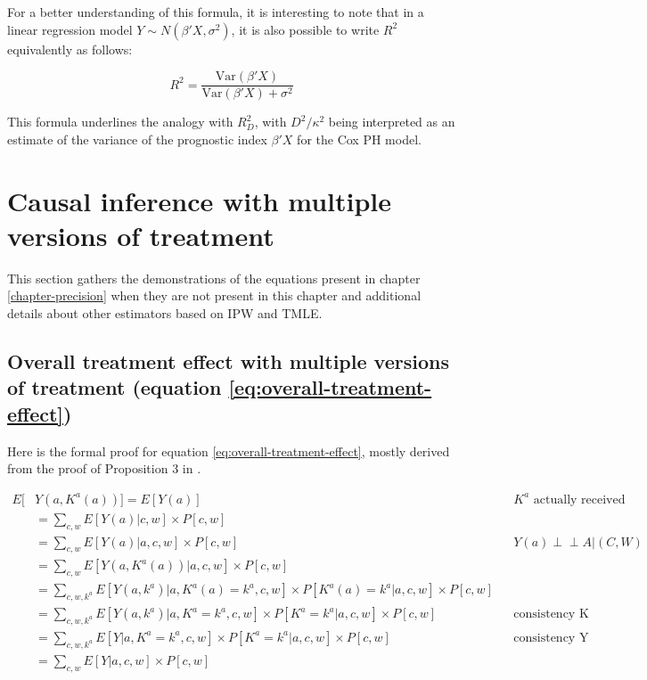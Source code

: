 \documentclass[a4paper,12pt,twoside,onecolumn,openright,final,oldfontcommands]{memoir}
\begin{document}
For a better understanding of this formula, it is interesting to note
that in a linear regression model \(Y\sim N(\beta'X, \sigma^2)\), it is
also possible to write \(R^2\) equivalently as follows:

\[R^2=\dfrac{\text{Var}(\beta'X)}{\text{Var}(\beta'X)+\sigma^2}\]

This formula underlines the analogy with \(R^2_D\), with
\(D^2/\kappa^2\) being interpreted as an estimate of the variance of the
prognostic index \(\beta'X\) for the Cox PH model.

\section{Causal inference with multiple versions of
treatment}\label{causal-inference-with-multiple-versions-of-treatment}

This section gathers the demonstrations of the equations present in
chapter \ref{chapter-precision} when they are not present in this
chapter and additional details about other estimators based on IPW and
TMLE.

\subsection{Overall treatment effect with multiple versions of treatment
(equation
\eqref{eq:overall-treatment-effect})}\label{appendix-overall-treatment-effect}

Here is the formal proof for equation \eqref{eq:overall-treatment-effect},
mostly derived from the proof of Proposition 3 in
\citep{vanderweele2013causal}.

\begingroup
\footnotesize

\begin{equation*}
\begin{aligned}
  E[ & Y(a, K^a(a))] = E[Y(a)] &&K^a \text{ actually received}\\
                  & = \sum_{c,w} E[Y(a)|c,w] \times P[c,w]&& \\
                  & = \sum_{c,w} E[Y(a)|a,c,w] \times P[c,w]
                  && Y(a) \perp \!\!\! \perp A | (C,W)\\
                  & = \sum_{c,w} E[Y(a, K^a(a))|a,c,w] \times P[c,w]&& \\
                  & = \sum_{c,w,k^a} E[Y(a, k^a)|a,K^a(a)=k^a,c,w]\times P[K^a(a)=k^a|a,c,w] \times P[c,w] &&\\
                  & = \sum_{c,w,k^a} E[Y(a, k^a)|a,K^a=k^a,c,w]\times P[K^a=k^a|a,c,w] \times P[c,w]
                  &&\text{consistency K} \\
                  & = \sum_{c,w,k^a} E[Y|a,K^a=k^a,c,w]\times P[K^a=k^a|a,c,w] \times P[c,w]
                  &&\text{consistency Y} \\
                  & = \sum_{c,w} E[Y|a,c,w]\times P[c,w]
\end{aligned}
\end{equation*}
\end{document}
